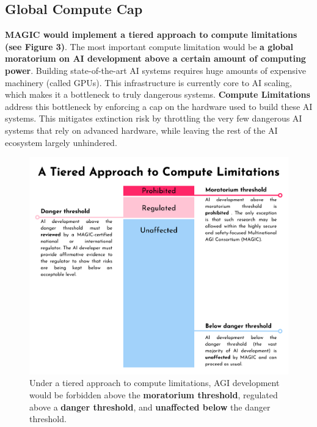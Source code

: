 \documentclass[12pt,a4paper]{article}
\begin{document}
\subsection{Global Compute Cap}

\textbf{MAGIC would implement a tiered approach to compute limitations (see Figure 3)}. The most important compute limitation would be \textbf{a global moratorium on AI development above a certain amount of computing power}. Building state-of-the-art AI systems requires huge amounts of expensive machinery (called GPUs). This infrastructure is currently core to AI scaling, which makes it a bottleneck to truly dangerous systems. \textbf{Compute Limitations} address this bottleneck by enforcing a cap on the hardware used to build these AI systems. This mitigates extinction risk by throttling the very few dangerous AI systems that rely on advanced hardware, while leaving the rest of the AI ecosystem largely unhindered.

\begin{figure}[h]
    \centering
    \includegraphics[width=1\linewidth]{figure3.png}
    \caption{Under a tiered approach to compute limitations, AGI development would be forbidden above the \textbf{moratorium threshold}, regulated above a \textbf{danger threshold}, and \textbf{unaffected below} the danger threshold.}
    \label{fig:enter-label}
\end{figure}
\end{document}
